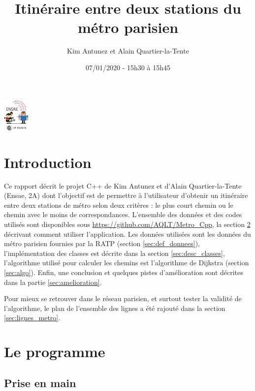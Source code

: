 \documentclass[,french]{article}
\title{Itinéraire entre deux stations du métro parisien}
\author{Kim Antunez et Alain Quartier-la-Tente}
\date{07/01/2020 - 15h30 à 15h45}
\begin{document}
\maketitle

\begin{center}
\includegraphics[width = 0.1\textwidth]{img/LOGO-ENSAE-avatar.png}
\end{center}

{
\hypersetup{linkcolor=}
\setcounter{tocdepth}{2}
\tableofcontents
}
\hypertarget{introduction}{%
\section{Introduction}\label{introduction}}

Ce rapport décrit le projet C++ de Kim Antunez et d'Alain
Quartier-la-Tente (Ensae, 2A) dont l'objectif est de permettre à
l'utilisateur d'obtenir un itinéraire entre deux stations de métro selon
deux critères : le plus court chemin ou le chemin avec le moins de
correspondances. L'ensemble des données et des codes utilisés sont
disponibles sous \url{https://github.com/AQLT/Metro_Cpp}, la section
\ref{sec:le_programme} décrivant comment utiliser l'application. Les
données utilisées sont les données du métro parisien fournies par la
RATP (section \ref{sec:def_donnees}), l'implémentation des classes est
décrite dans la section \ref{sec:desc_classes}, l'algorithme utilisé
pour calculer les chemins est l'algorithme de Dijkstra (section
\ref{sec:algo}). Enfin, une conclusion et quelques pistes d'amélioration
sont décrites dans la partie \ref{sec:amelioration}.

Pour mieux se retrouver dans le réseau parisien, et surtout tester la
validité de l'algorithme, le plan de l'ensemble des lignes a été rajouté
dans la section \ref{sec:lignes_metro}.

\hypertarget{sec:le_programme}{%
\section{Le programme}\label{sec:le_programme}}

\hypertarget{prise-en-main}{%
\subsection{Prise en main}\label{prise-en-main}}
\end{document}
